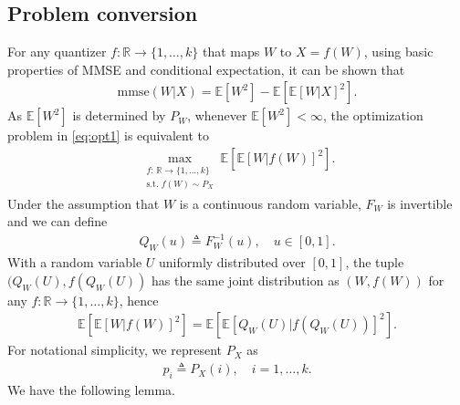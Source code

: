 \documentclass[10pt,a4paper]{amsart}
\newcommand{\R}{\mathbb{R}}
\newcommand{\E}{\mathbb{E}}
\def\deq{\triangleq}
\begin{document}
\subsection{Problem conversion}
For any quantizer $f:\R\rightarrow\{1,\ldots,k\}$ that maps $W$ to $X=f(W)$, using basic properties of MMSE and conditional expectation, it can be shown that
\begin{align}
    \text{mmse}(W|X) = \E[W^2]- \E[\E[W|X]^2] .\label{eq:mmse_decomp}
\end{align}
As $\E[W^2]$ is determined by $P_W$, whenever $\E[W^2] < \infty$, the optimization problem in \eqref{eq:opt1} is equivalent to 
\begin{align}
    \max_{\substack{f:\,\R \rightarrow \{1,\ldots,k\} \\ \text{s.t. } f(W)\sim P_X}} \E[\E[W|f(W)]^2] . \label{eq:max_E[m^2]}
\end{align}
Under the assumption that $W$ is a continuous random variable, $F_W$ is invertible and we can define
\begin{align}
    Q_W(u) \deq F_W^{-1}(u) , \quad u\in[0,1] .
\end{align}
With a random variable $U$ uniformly distributed over $[0,1]$, the tuple $(Q_W(U), f(Q_W(U))$ has the same joint distribution as $(W, f(W))$ for any $f:\R\rightarrow\{1,\ldots,k\}$, hence
\begin{align}
 \E[\E[W|f(W)]^2] = \E[\E[Q_W(U)|f(Q_W(U))]^2] .
\end{align}
For notational simplicity, we represent $P_X$ as
\begin{align}
    p_i \deq P_X(i) , \quad i=1,\ldots,k .
\end{align}
We have the following lemma.
\end{document}
